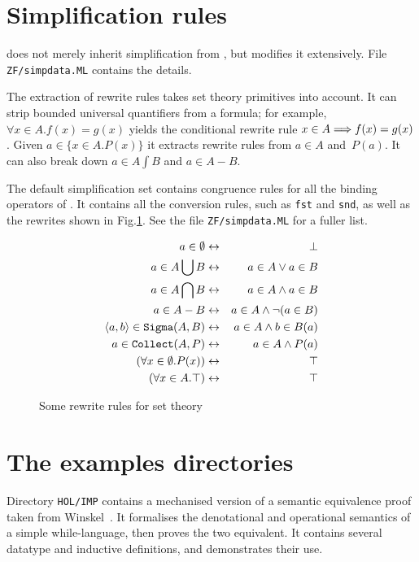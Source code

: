 \section{Simplification rules}
{\ZF} does not merely inherit simplification from \FOL, but modifies it
extensively.  File {\tt ZF/simpdata.ML} contains the details.

The extraction of rewrite rules takes set theory primitives into account.
It can strip bounded universal quantifiers from a formula; for example,
${\forall x\in A.f(x)=g(x)}$ yields the conditional rewrite rule $x\in A \Longrightarrow
f(x)=g(x)$.  Given $a\in\{x\in A.P(x)\}$ it extracts rewrite rules from
$a\in A$ and~$P(a)$.  It can also break down $a\in A\int B$ and $a\in A-B$.

The default simplification set contains congruence rules for
all the binding operators of {\ZF}\@.  It contains all the conversion
rules, such as {\tt fst} and {\tt snd}, as well as the rewrites
shown in Fig.\ts\ref{zf-simpdata}.  See the file 
{\tt ZF/simpdata.ML} for a fuller list.

\begin{figure}
\begin{eqnarray*}
  a\in \emptyset        & \leftrightarrow &  \bot\\
  a \in A \bigcup B      & \leftrightarrow &  a\in A \vee a\in B\\
  a \in A \bigcap B      & \leftrightarrow &  a\in A \wedge a\in B\\
  a \in A-B             & \leftrightarrow &  a\in A \wedge \neg (a\in B)\\
  \langle a,b\rangle\in {\tt Sigma}(A,B)
                        & \leftrightarrow &  a\in A \wedge b\in B(a)\\
  a \in {\tt Collect}(A,P)      & \leftrightarrow &  a\in A \wedge P(a)\\
  (\forall x \in \emptyset. P(x)) & \leftrightarrow &  \top\\
  (\forall x \in A. \top)       & \leftrightarrow &  \top
\end{eqnarray*}
\caption{Some rewrite rules for set theory} \label{zf-simpdata}
\end{figure}


\section{The examples directories}
Directory {\tt HOL/IMP} contains a mechanised version of a semantic
equivalence proof taken from Winskel~\cite{winskel93}.  It formalises the
denotational and operational semantics of a simple while-language, then
proves the two equivalent.  It contains several datatype and inductive
definitions, and demonstrates their use.

